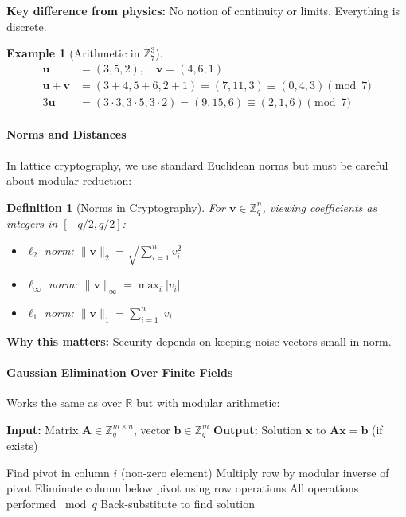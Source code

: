 \documentclass[11pt,a4paper]{article}
\newtheorem{definition}{Definition}
\newtheorem{example}{Example}
\begin{document}
\textbf{Key difference from physics:} No notion of continuity or limits. Everything is discrete.

\begin{example}[Arithmetic in $\mathbb{Z}_7^3$]
\begin{align}
\mathbf{u} &= (3, 5, 2), \quad \mathbf{v} = (4, 6, 1)\\
\mathbf{u} + \mathbf{v} &= (3+4, 5+6, 2+1) = (7, 11, 3) \equiv (0, 4, 3) \pmod{7}\\
3\mathbf{u} &= (3 \cdot 3, 3 \cdot 5, 3 \cdot 2) = (9, 15, 6) \equiv (2, 1, 6) \pmod{7}
\end{align}
\end{example}

\paragraph{Norms and Distances}

In lattice cryptography, we use standard Euclidean norms but must be careful about modular reduction:

\begin{definition}[Norms in Cryptography]
For $\mathbf{v} \in \mathbb{Z}_q^n$, viewing coefficients as integers in $[-q/2, q/2]$:
\begin{itemize}
    \item $\ell_2$ norm: $\|\mathbf{v}\|_2 = \sqrt{\sum_{i=1}^n v_i^2}$
    \item $\ell_\infty$ norm: $\|\mathbf{v}\|_\infty = \max_i |v_i|$
    \item $\ell_1$ norm: $\|\mathbf{v}\|_1 = \sum_{i=1}^n |v_i|$
\end{itemize}
\end{definition}

\textbf{Why this matters:} Security depends on keeping noise vectors small in norm.

\paragraph{Gaussian Elimination Over Finite Fields}

Works the same as over $\mathbb{R}$ but with modular arithmetic:

\begin{algorithm}
\caption{Gaussian Elimination mod $q$}
\begin{algorithmic}[1]
\State \textbf{Input:} Matrix $\mathbf{A} \in \mathbb{Z}_q^{m \times n}$, vector $\mathbf{b} \in \mathbb{Z}_q^m$
\State \textbf{Output:} Solution $\mathbf{x}$ to $\mathbf{Ax} = \mathbf{b}$ (if exists)

    \State Find pivot in column $i$ (non-zero element)
    \State Multiply row by modular inverse of pivot
    \State Eliminate column below pivot using row operations
    \State All operations performed $\bmod q$
\EndFor
\State Back-substitute to find solution
\end{algorithmic}
\end{algorithm}
\end{document}
